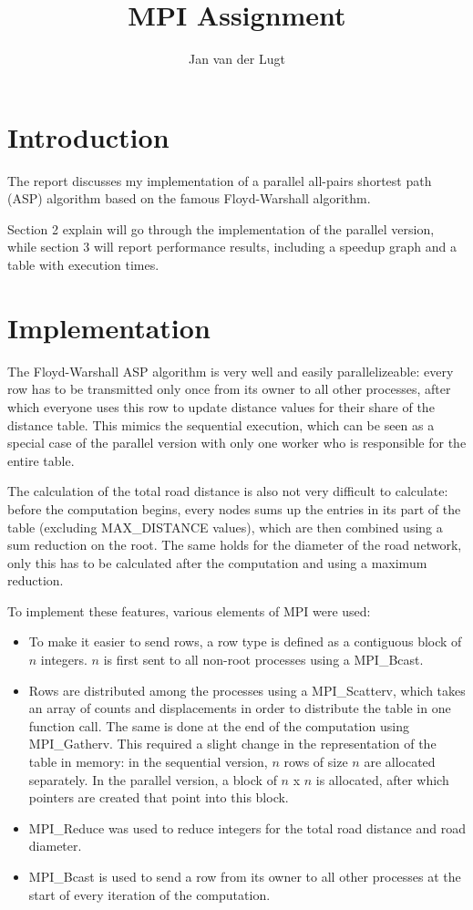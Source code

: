 \documentclass[11pt,a4paper]{article}
\title{MPI Assignment}
\author{Jan van der Lugt}
\date{}
\begin{document}
\maketitle

\section{Introduction}
The report discusses my implementation of a parallel all-pairs shortest path (ASP) algorithm based on the famous Floyd-Warshall algorithm.

Section 2 explain will go through the implementation of the parallel version, while section 3 will report performance results, including a speedup graph and a table with execution times.

\section{Implementation}
The Floyd-Warshall ASP algorithm is very well and easily parallelizeable: every row has to be transmitted only once from its owner to all other processes, after which everyone uses this row to update distance values for their share of the distance table. This mimics the sequential execution, which can be seen as a special case of the parallel version with only one worker who is responsible for the entire table.

The calculation of the total road distance is also not very difficult to calculate: before the computation begins, every nodes sums up the entries in its part of the table (excluding MAX\_DISTANCE values), which are then combined using a sum reduction on the root. The same holds for the diameter of the road network, only this has to be calculated after the computation and using a maximum reduction.

To implement these features, various elements of MPI were used:
\begin{itemize}
\item To make it easier to send rows, a row type is defined as a contiguous block of $n$ integers. $n$ is first sent to all non-root processes using a MPI\_Bcast.
\item Rows are distributed among the processes using a MPI\_Scatterv, which takes an array of counts and displacements in order to distribute the table in one function call. The same is done at the end of the computation using MPI\_Gatherv. This required a slight change in the representation of the table in memory: in the sequential version, $n$ rows of size $n$ are allocated separately. In the parallel version, a block of $n$ x $n$ is allocated, after which pointers are created that point into this block.
\item MPI\_Reduce was used to reduce integers for the total road distance and road diameter.
\item MPI\_Bcast is used to send a row from its owner to all other processes at the start of every iteration of the computation.
\end{itemize}
\end{document}
